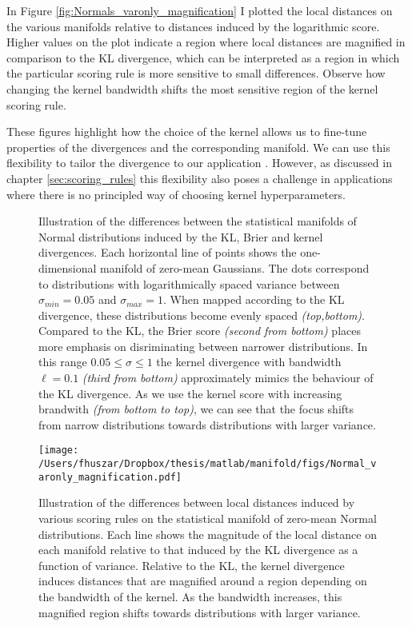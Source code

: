In Figure \ref{fig:Normals_varonly_magnification} I plotted the local distances on the various manifolds relative to distances induced by the logarithmic score. Higher values on the plot indicate a region where local distances are magnified in comparison to the KL divergence, which can be interpreted as a region in which the particular scoring rule is more sensitive to small differences. Observe how changing the kernel bandwidth shifts the most sensitive region of the kernel scoring rule.

These figures highlight how the choice of the kernel allows us to fine-tune properties of the divergences and the corresponding manifold. We can use this flexibility to tailor the divergence to our application \citep{tailoring}. However, as discussed in chapter \ref{sec:scoring_rules} this flexibility also poses a challenge in applications where there is no principled way of choosing kernel hyperparameters.

\begin{figure} %
\begin{center}
 \end{center}
\caption{ Illustration of the differences between the statistical manifolds of Normal distributions induced by the KL, Brier and kernel divergences. Each horizontal line of points shows the one-dimensional manifold of zero-mean Gaussians. The dots correspond to distributions with logarithmically spaced variance between $\sigma_{min}=0.05$ and $\sigma_{max}=1$. When mapped according to the KL divergence, these distributions become evenly spaced \emph{(top,bottom)}. Compared to the KL, the Brier score \emph{(second from bottom)} places more emphasis on disriminating between narrower distributions. In this range $0.05 \leq \sigma \leq 1$ the kernel divergence with bandwidth $\ell=0.1$ \emph{(third from bottom)} approximately mimics the behaviour of the KL divergence. As we use the kernel score with increasing brandwith \emph{(from bottom to top)}, we can see that the focus shifts from narrow distributions towards distributions with larger variance.}
\label{fig:Normal_varonly_comparison}
\end{figure}

\begin{figure} %
\begin{center}
  \texttt{[image: /Users/fhuszar/Dropbox/thesis/matlab/manifold/figs/Normal\_varonly\_magnification.pdf]}
\end{center}
\caption{Illustration of the differences between local distances induced by various scoring rules on the statistical manifold of zero-mean Normal distributions. Each line shows the magnitude of the local distance on each manifold relative to that induced by the KL divergence as a function of variance. Relative to the KL, the kernel divergence induces distances that are magnified around a region depending on the bandwidth of the kernel. As the bandwidth increases, this magnified region shifts towards distributions with larger variance.}
\label{fig:Normal_varonly_magnification}
\end{figure}


